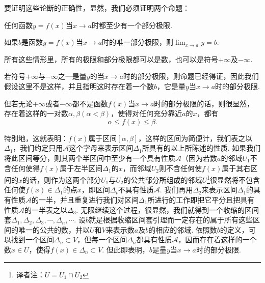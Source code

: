 \documentclass[color=cyan,mathpazo,titlestyle=hang]{elegantbook_mac}
\begin{document}
要证明这些论断的正确性，显然，我们必须证明两个命题：

\begin{newprop}
\label{part-lim}
任何函数$y=f(x)$当$x\to a$时都至少有一个部分极限.
\end{newprop}

\begin{newprop}
如果$b$是函数$y=f(x)$当$x\to a$时的唯一部分极限，则$\lim_{x\to a}y = b$.
\label{part-lim-2}
\end{newprop}

所有这些情形里，所有的极限和部分极限都可以是数，也可以是符号$+\infty$及$-\infty$.

\begin{newproof}[第一个命题]
若符号$+\infty$与$-\infty$之一是量$y$的当$x\to a$时的部分极限，则命题已经得证，因此我们假设这里不是这样，并且指明这时存在着一个数$b$，它是量$y$当$x\to a$时的部分极限. 

但若无论$+\infty$或者$-\infty$都不是函数$f(x)$当$x\to a$时的部分极限的话，则很显然，存在着这样的一对数$\alpha,\beta (\alpha < \beta)$，使得对任何充分靠近$a$的$x$，都有$$\alpha \leqslant f(x) \leqslant \beta.$$

特别地，这就表明：$f(x)$属于区间$[\alpha, \beta]$，这样的区间为简便计，我们表之以$\Delta_1$，我们约定只用$\mathcal{A}$这个字母来表示区间$\Delta_1$所具有的以上所陈述的性质. 如果我们将此区间等分，则其两个半区间中至少有一个具有性质$\mathcal{A}$（因为若数$a$的邻域$U_1$不含任何使得$f(x)$属于左半区间$\Delta_1$的$x$，而邻域$U_2$则不含任何使$f(x)$属于其右区间的$x$的话，则作为这两个部分$U_1$与$U_2$的公共部分所组成的邻域$U$\footnote{译者注：$U = U_1 \cap U_2$}很显然将不包含任何使$f(x) \in \Delta_1$的点$x$，即区间$\Delta_t$不具有性质$\mathcal{A}$. 我们再用$\Delta_2$来表示区间$\Delta_1$的具有性质$\mathcal{A}$的一半，并且重复进行我们对区间$\Delta_1$所进行的工作即把它平分且把具有性质$\mathcal{A}$的一半表之以$\Delta_3$. 无限继续这个过程，很显然，我们就得到一个收缩的区间套$\Delta_1, \Delta_2, \Delta_3, \cdots, \Delta_n, \cdots$. 设$b$就是根据收缩区间套引理而一定存在的属于所有这些区间的唯一的公共的数，并以$U$和$V$来表示数$a$及$b$的相应的邻域. 依照数$b$的定义，可以找到一个区间$\Delta_n \subset V$，但每一个区间$\Delta_n$都具有性质$\mathcal{A}$，因而存在着这样的一个数$x\in U$，使得$f(x)\in \Delta_n \subset V$. 但此即表明，$b$是量$y$当$x\to a$时的部分极限.
\end{newproof}
\end{document}
